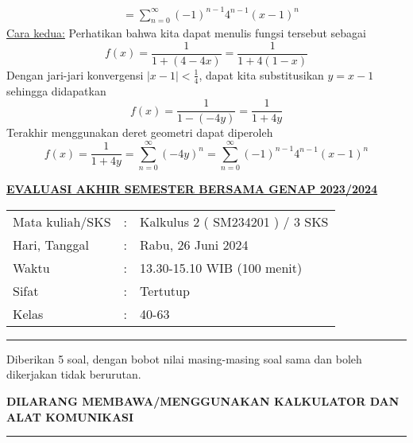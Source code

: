 \documentclass[11pt,openany,a4paper]{article}
\begin{document}
\begin{enumerate}
\begin{align*}
            &= \boxed{\sum_{n=0}^{\infty} (-1)^{n-1} 4^{n-1} (x-1)^n}
        \end{align*}
        \underline{Cara kedua:} Perhatikan bahwa kita dapat menulis fungsi tersebut sebagai
        \[
            f(x) = \frac{1}{1+(4-4x)} = \frac{1}{1+4(1-x)} 
        \]
        Dengan jari-jari konvergensi \( |x-1| < \frac{1}{4} \), dapat kita substitusikan $y=x-1$ sehingga didapatkan
        \[
            f(x) = \frac{1}{1-(-4y)} = \frac{1}{1+4y}
        \]
        Terakhir menggunakan deret geometri dapat diperoleh
        \[
            f(x) = \frac{1}{1+4y}=\sum_{n=0}^{\infty} (-4y)^n = \boxed{\sum_{n=0}^{\infty} (-1)^{n-1} 4^{n-1} (x-1)^n}
        \]
    \end{enumerate}

    \newpage
    \pagestyle{problems}
    
    \begin{center}
	{\underline{\textbf{\MakeUppercase{Evaluasi Akhir Semester Bersama Genap 2023/2024}}}}
    \end{center}

    \begin{center}
	\begin{tabular}{lcl}
		Mata kuliah/SKS & : & Kalkulus 2 ( SM234201 ) / 3 SKS\\
		Hari, Tanggal & : & Rabu, 26 Juni 2024\\
		Waktu & : & 13.30-15.10 WIB (100 menit)\\
		Sifat & : & Tertutup\\
		Kelas & : & 40-63
	\end{tabular}
    \end{center}
	
    \noindent\rule{\textwidth}{2.pt}
	
    \setlength{\parindent}{5pt}
    \par Diberikan 5 soal, dengan bobot nilai masing-masing soal sama dan boleh dikerjakan tidak berurutan.
    \setlength{\parindent}{5pt}
    \setlength{\parindent}{5pt}
    {\small
    \par \textbf{\MakeUppercase{Dilarang membawa/menggunakan kalkulator dan alat komunikasi}}
    }
    \par {}
	
    \noindent\rule{\textwidth}{2.pt}
	
\end{document}
